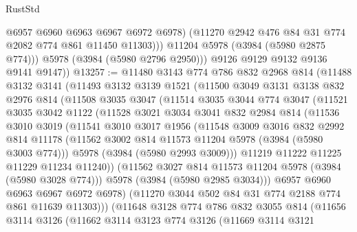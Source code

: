 \begin{lexlean}{RustStd}
\begin{coremodule}
                  @6957
                  @6960
                  @6963
                  @6967
                  @6972
                  @6978)
                (@11270 @2942 @476 @84 @31 @774 @2082 @774 @861 @11450 @11303)))
            @11204
            @5978
            (@3984 (@5980 @2875 @774)))
          @5978
          (@3984 (@5980 @2796 @2950)))
        @9126
        @9129
        @9132
        @9136
        @9141
        @9147))
@13257 := @11480
    @3143
    @774
    @786
    @832
    @2968
    @814
    (@11488
      @3132
      @3141
      (@11493
        @3132
        @3139
        @1521
        (@11500
          @3049
          @3131
          @3138
          @832
          @2976
          @814
          (@11508
            @3035
            @3047
            (@11514
              @3035
              @3044
              @774
              @3047
              (@11521
                @3035
                @3042
                @1122
                (@11528
                  @3021
                  @3034
                  @3041
                  @832
                  @2984
                  @814
                  (@11536
                    @3010
                    @3019
                    (@11541
                      @3010
                      @3017
                      @1956
                      (@11548
                        @3009
                        @3016
                        @832
                        @2992
                        @814
                        @11178
                        (@11562 @3002 @814 @11573 @11204 @5978 (@3984 (@5980 @3003 @774)))
                        @5978
                        (@3984 (@5980 @2993 @3009)))
                      @11219
                      @11222
                      @11225
                      @11229
                      @11234
                      @11240))
                  (@11562 @3027 @814 @11573 @11204 @5978 (@3984 (@5980 @3028 @774)))
                  @5978
                  (@3984 (@5980 @2985 @3034)))
                @6957
                @6960
                @6963
                @6967
                @6972
                @6978)
              (@11270 @3044 @502 @84 @31 @774 @2188 @774 @861 @11639 @11303)))
          (@11648
            @3128
            @774
            @786
            @832
            @3055
            @814
            (@11656
              @3114
              @3126
              (@11662
                @3114
                @3123
                @774
                @3126
                (@11669
                  @3114
                  @3121

\end{coremodule}
\end{lexlean}
